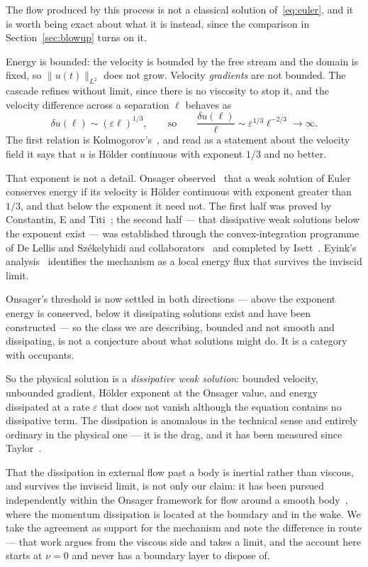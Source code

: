 \documentclass[11pt]{article}
\newcommand{\eps}{\varepsilon}
\begin{document}
The flow produced by this process is not a classical solution of~\eqref{eq:euler}, and it is worth
being exact about what it is instead, since the comparison in Section~\ref{sec:blowup} turns on it.

Energy is bounded: the velocity is bounded by the free stream and the domain is fixed, so
$\|u(t)\|_{L^2}$ does not grow. Velocity \emph{gradients} are not bounded. The cascade refines
without limit, since there is no viscosity to stop it, and the velocity difference across a
separation $\ell$ behaves as
\begin{equation}\label{eq:holder}
\delta u(\ell)\sim(\eps\ell)^{1/3},
\qquad\text{so}\qquad
\frac{\delta u(\ell)}{\ell}\sim \eps^{1/3}\ell^{-2/3}\to\infty .
\end{equation}
The first relation is Kolmogorov's~\cite{kolmogorov41}, and read as a statement about the velocity
field it says that $u$ is H\"older continuous with exponent $1/3$ and no better.

That exponent is not a detail. Onsager observed~\cite{onsager} that a weak solution of Euler
conserves energy if its velocity is H\"older continuous with exponent greater than $1/3$, and that
below the exponent it need not. The first half was proved by Constantin, E and Titi~\cite{cet}; the
second half --- that dissipative weak solutions below the exponent exist --- was established through
the convex-integration programme of De Lellis and Sz\'ekelyhidi and
collaborators~\cite{dls,bdlis} and completed by Isett~\cite{isett}. Eyink's analysis~\cite{eyink}
identifies the mechanism as a local energy flux that survives the inviscid limit.

Onsager's threshold is now settled in both directions --- above the exponent energy is conserved,
below it dissipating solutions exist and have been constructed --- so the class we are describing,
bounded and not smooth and dissipating, is not a conjecture about what solutions might do. It is a
category with occupants.

So the physical solution is a \emph{dissipative weak solution}: bounded velocity, unbounded
gradient, H\"older exponent at the Onsager value, and energy dissipated at a rate $\eps$ that does
not vanish although the equation contains no dissipative term. The dissipation is anomalous in the
technical sense and entirely ordinary in the physical one --- it is the drag, and it has been
measured since Taylor~\cite{taylor}.

That the dissipation in external flow past a body is inertial rather than viscous, and survives
the inviscid limit, is not only our claim: it has been pursued independently within the Onsager
framework for flow around a smooth body~\cite{inertialbody}, where the momentum dissipation is
located at the boundary and in the wake. We take the agreement as support for the mechanism and note
the difference in route --- that work argues from the viscous side and takes a limit, and the
account here starts at $\nu=0$ and never has a boundary layer to dispose of.
\end{document}
